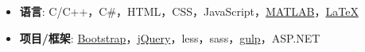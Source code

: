   \begin{itemize}[leftmargin=*]
    \item \textbf{语言}: C/C++，C\#，HTML，CSS，JavaScript，\href{http://cn.mathworks.com/products/matlab/}{MATLAB}，\href{http://www.latex-project.org/}{\LaTeX}
    \item \textbf{项目/框架}: \href{http://www.bootcss.com/}{Bootstrap}，\href{https://jquery.com/}{jQuery}，less，sass，\href{http://gulpjs.com/}{gulp}，ASP.NET
  \end{itemize}
